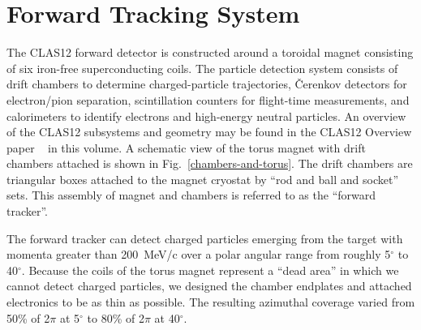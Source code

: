 \section{Forward Tracking System}
\label{overview}

The CLAS12 forward detector is constructed around a toroidal magnet consisting of six 
iron-free superconducting coils.  The particle detection system consists of drift 
chambers to determine charged-particle trajectories, {\v C}erenkov detectors 
for electron/pion separation, scintillation counters for flight-time 
measurements, and calorimeters to identify electrons and high-energy neutral 
particles.  An overview of the CLAS12 subsystems and geometry may be found in the 
CLAS12 Overview paper ~\cite{clas12-overview} in this volume.  A schematic view of the 
torus magnet with drift chambers
attached is shown in Fig.~\ref{chambers-and-torus}.   The drift chambers are 
triangular boxes attached to the magnet cryostat by ``rod and ball and socket'' sets.  
This assembly of magnet and chambers is referred to as the ``forward tracker''. 

The forward tracker can detect charged particles emerging from the target with
momenta greater than 200~MeV/c over a polar angular range from roughly 5$^{\circ}$ to 
40$^{\circ}$.  Because the coils of the torus magnet represent a ``dead area''
in which we cannot detect charged particles, we designed the chamber endplates
and attached electronics to be as thin as possible.  The resulting azimuthal
coverage varied from 50\% of 2$\pi$ at 5$^{\circ}$ to 80\% of 2$\pi$ at 40$^{\circ}$.


